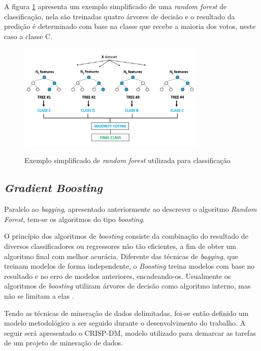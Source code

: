 A figura \ref{fig:random-forest} apresenta um exemplo simplificado de uma \textit{random forest} de classificação, nela são treinadas quatro árvores de decisão e o resultado da predição é determinado com base na classe que recebe a maioria dos votos, neste caso a classe C.

 \begin{figure}[!htb]
    \centering
    \caption{Exemplo simplificado de \textit{random forest} utilizada para classificação}
    \includegraphics[width=0.8\textwidth]{./dados/figuras/random-forest}
    \label{fig:random-forest}
\end{figure}

\subsection{\textit{Gradient Boosting}}
\label{ssec:gradientBoosting}

Paralelo ao \textit{bagging}, apresentado anteriormente ao descrever o algoritmo \textit{Random Forest}, tem-se os algoritmos do tipo \textit{boosting}.

O princípio dos algoritmos de \textit{boosting} consiste da combinação do resultado de diversos classificadores ou regressores não tão eficientes, a fim de obter um algoritmo final com melhor acurácia. 
Diferente das técnicas de \textit{bagging}, que treinam modelos de forma independente, o \textit{Boosting} treina modelos com base no resultado e no erro de modelos anteriores, encadeando-os. Usualmente os algoritmos de \textit{boosting} utilizam árvores de decisão como algoritmo interno, mas não se limitam a elas \cite{Geron2017}.

Tendo as técnicas de mineração de dados delimitadas, foi-se então definido um modelo metodológico a ser seguido durante o desenvolvimento do trabalho.
A seguir será apresentado o CRISP-DM, modelo utilizado para demarcar as tarefas de um projeto de mineração de dados.

